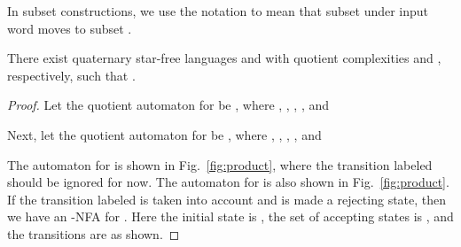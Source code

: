 \documentclass{llncs}
\begin{document}
In subset constructions, we use the notation  to mean that subset  under input word  moves to subset .
\begin{theorem}
\label{thm:product}
There exist
quaternary star-free languages  and  with quotient complexities  and , respectively, such that  .\end{theorem}
\begin{proof}
Let the quotient automaton for  be , where
, , , , and 




Next, let the quotient automaton for  be , where
, , , , and 

The automaton  for  is shown in Fig.~\ref{fig:product}, where the transition labeled
 should be ignored for now. 
The automaton  for  is also shown in  Fig.~\ref{fig:product}. 
If the transition labeled  is taken into account and  is made a rejecting state, then we have an -NFA for .
Here the initial state is , the set of accepting states is , and the transitions are as shown.


\end{proof}
\end{document}
